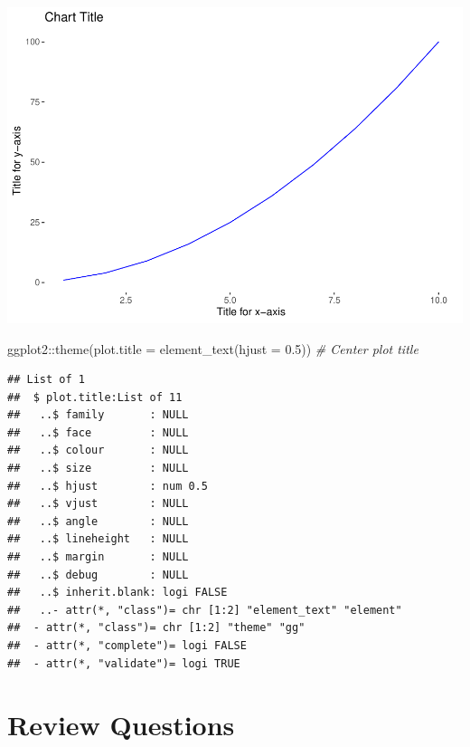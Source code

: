 \documentclass[
]{book}
\newenvironment{Shaded}{\begin{snugshade}}{\end{snugshade}}
\newcommand{\AttributeTok}[1]{\textcolor[rgb]{0.77,0.63,0.00}{#1}}
\newcommand{\CommentTok}[1]{\textcolor[rgb]{0.56,0.35,0.01}{\textit{#1}}}
\newcommand{\FloatTok}[1]{\textcolor[rgb]{0.00,0.00,0.81}{#1}}
\newcommand{\FunctionTok}[1]{\textcolor[rgb]{0.00,0.00,0.00}{#1}}
\newcommand{\NormalTok}[1]{#1}
\newcommand{\SpecialCharTok}[1]{\textcolor[rgb]{0.00,0.00,0.00}{#1}}
\begin{document}
\includegraphics{The_Fundamentals_of_People_Analytics_files/figure-latex/unnamed-chunk-54-1.pdf}

\begin{Shaded}
\begin{Highlighting}[]
\NormalTok{ggplot2}\SpecialCharTok{::}\FunctionTok{theme}\NormalTok{(}\AttributeTok{plot.title =} \FunctionTok{element\_text}\NormalTok{(}\AttributeTok{hjust =} \FloatTok{0.5}\NormalTok{)) }\CommentTok{\# Center plot title}
\end{Highlighting}
\end{Shaded}

\begin{verbatim}
## List of 1
##  $ plot.title:List of 11
##   ..$ family       : NULL
##   ..$ face         : NULL
##   ..$ colour       : NULL
##   ..$ size         : NULL
##   ..$ hjust        : num 0.5
##   ..$ vjust        : NULL
##   ..$ angle        : NULL
##   ..$ lineheight   : NULL
##   ..$ margin       : NULL
##   ..$ debug        : NULL
##   ..$ inherit.blank: logi FALSE
##   ..- attr(*, "class")= chr [1:2] "element_text" "element"
##  - attr(*, "class")= chr [1:2] "theme" "gg"
##  - attr(*, "complete")= logi FALSE
##  - attr(*, "validate")= logi TRUE
\end{verbatim}

\hypertarget{review-questions}{%
\section{Review Questions}\label{review-questions}}
\end{document}
